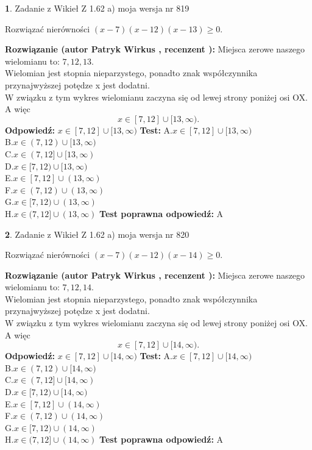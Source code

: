\documentclass[12pt, a4paper]{article}
\theoremstyle{definition} %
\newtheorem{zad}{}
\newcommand{\zadStart}[1]{\begin{zad}#1\newline}
\newcommand{\zadStop}{\end{zad}}
\newcommand{\rozwStart}[2]{\noindent \textbf{Rozwiązanie (autor #1 , recenzent #2): }\newline}
\newcommand{\rozwStop}{\newline}
\newcommand{\odpStart}{\noindent \textbf{Odpowiedź:}\newline}
\newcommand{\odpStop}{\newline}
\newcommand{\testStart}{\noindent \textbf{Test:}\newline}
\newcommand{\testStop}{\newline}
\newcommand{\kluczStart}{\noindent \textbf{Test poprawna odpowiedź:}\newline}
\newcommand{\kluczStop}{\newline}
\begin{document}
\zadStart{Zadanie z Wikieł Z 1.62 a) moja wersja nr 819}

Rozwiązać nierówności $(x-7)(x-12)(x-13)\ge0$.
\zadStop
\rozwStart{Patryk Wirkus}{}
Miejsca zerowe naszego wielomianu to: $7, 12, 13$.\\
Wielomian jest stopnia nieparzystego, ponadto znak współczynnika przy\linebreak najwyższej potędze x jest dodatni.\\ W związku z tym wykres wielomianu zaczyna się od lewej strony poniżej osi OX. A więc $$x \in [7,12] \cup [13,\infty).$$
\rozwStop
\odpStart
$x \in [7,12] \cup [13,\infty)$
\odpStop
\testStart
A.$x \in [7,12] \cup [13,\infty)$\\
B.$x \in (7,12) \cup [13,\infty)$\\
C.$x \in (7,12] \cup [13,\infty)$\\
D.$x \in [7,12) \cup [13,\infty)$\\
E.$x \in [7,12] \cup (13,\infty)$\\
F.$x \in (7,12) \cup (13,\infty)$\\
G.$x \in [7,12) \cup (13,\infty)$\\
H.$x \in (7,12] \cup (13,\infty)$
\testStop
\kluczStart
A
\kluczStop



\zadStart{Zadanie z Wikieł Z 1.62 a) moja wersja nr 820}

Rozwiązać nierówności $(x-7)(x-12)(x-14)\ge0$.
\zadStop
\rozwStart{Patryk Wirkus}{}
Miejsca zerowe naszego wielomianu to: $7, 12, 14$.\\
Wielomian jest stopnia nieparzystego, ponadto znak współczynnika przy\linebreak najwyższej potędze x jest dodatni.\\ W związku z tym wykres wielomianu zaczyna się od lewej strony poniżej osi OX. A więc $$x \in [7,12] \cup [14,\infty).$$
\rozwStop
\odpStart
$x \in [7,12] \cup [14,\infty)$
\odpStop
\testStart
A.$x \in [7,12] \cup [14,\infty)$\\
B.$x \in (7,12) \cup [14,\infty)$\\
C.$x \in (7,12] \cup [14,\infty)$\\
D.$x \in [7,12) \cup [14,\infty)$\\
E.$x \in [7,12] \cup (14,\infty)$\\
F.$x \in (7,12) \cup (14,\infty)$\\
G.$x \in [7,12) \cup (14,\infty)$\\
H.$x \in (7,12] \cup (14,\infty)$
\testStop
\kluczStart
A
\kluczStop
\end{document}

